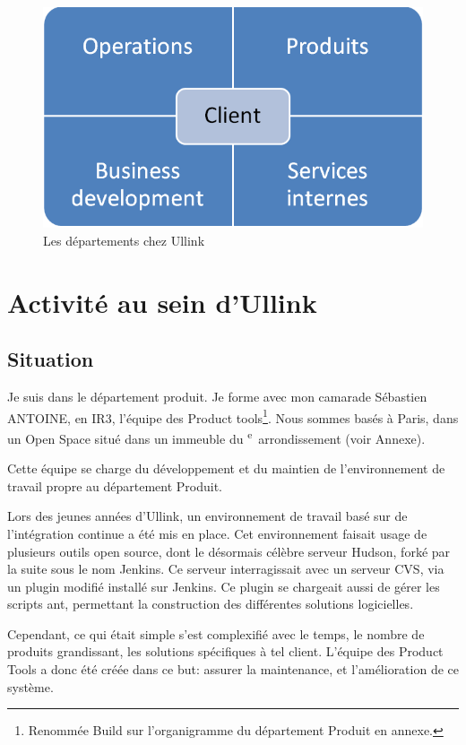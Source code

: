 \documentclass[a4paper, 11pt]{article}
\begin{document}
\begin{figure}
\includegraphics[width=\textwidth]{orga_deps_client.png}
\caption{Les départements chez Ullink}
\label{depts_ullink}
\end{figure}

\section{Activité au sein d'Ullink}

\subsection{Situation}

Je suis dans le département produit. Je forme avec mon camarade Sébastien ANTOINE, en IR3, l'équipe des Product tools\footnote{Renommée Build sur l'organigramme du département Produit en annexe.}. Nous sommes basés à Paris, dans un Open Space situé dans un immeuble du \textsc{}\textsuperscript{e}~arrondissement (voir Annexe).

Cette équipe se charge du développement et du maintien de l'environnement de travail propre au département Produit.

Lors des jeunes années d'Ullink, un environnement de travail basé sur de l'intégration continue a été mis en place. Cet environnement faisait usage de plusieurs outils open source, dont le désormais célèbre serveur Hudson, forké par la suite sous le nom Jenkins. Ce serveur interragissait avec un serveur CVS, via un plugin modifié installé sur Jenkins. Ce plugin se chargeait aussi de gérer les scripts ant, permettant la construction des différentes solutions logicielles.

Cependant, ce qui était simple s'est complexifié avec le temps, le nombre de produits grandissant, les solutions spécifiques à tel client. L'équipe des Product Tools a donc été créée dans ce but: assurer la maintenance, et l'amélioration de ce système.
\end{document}
